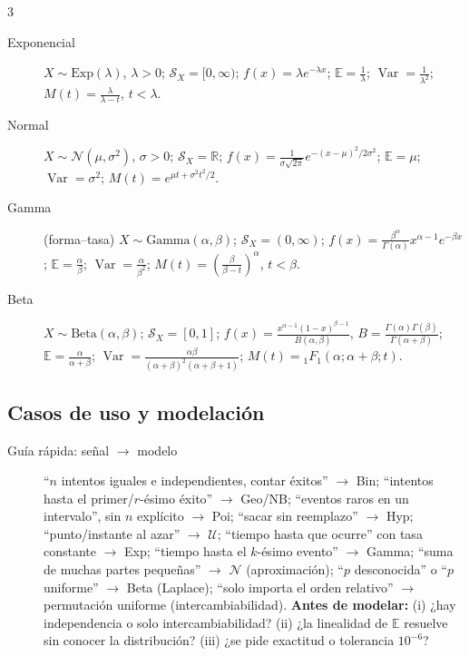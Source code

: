 \documentclass[8pt, spanish, mexico, letterpaper]{extarticle}
\newcommand{\E}{\mathbb{E}}
\newcommand{\Var}{\operatorname{Var}}
\newcommand{\<}{<}
\begin{document}
\begin{multicols*}{3}
\begin{description}
\item[Exponencial] $X\!\sim\!\mathrm{Exp}(\lambda)$, $\lambda\!>\!0$; $\mathcal S_X\!=\![0,\infty)$; $f(x)\!=\!\lambda e^{-\lambda x}$; $\E\!=\!\frac1\lambda$; $\Var\!=\!\frac1{\lambda^2}$; $M(t)\!=\!\frac\lambda{\lambda-t}$, $t\!<\!\lambda$.
\item[Normal] $X\!\sim\!\mathcal N(\mu,\sigma^2)$, $\sigma\!>\!0$; $\mathcal S_X\!=\!\mathbb R$; $f(x)\!=\!\frac1{\sigma\sqrt{2\pi}}e^{-(x-\mu)^2/2\sigma^2}$; $\E\!=\!\mu$; $\Var\!=\!\sigma^2$; $M(t)\!=\!e^{\mu t+\sigma^2t^2/2}$.
\item[Gamma] (forma--tasa) $X\!\sim\!\mathrm{Gamma}(\alpha,\beta)$; $\mathcal S_X\!=\!(0,\infty)$; $f(x)\!=\!\frac{\beta^\alpha}{\Gamma(\alpha)}x^{\alpha-1}e^{-\beta x}$; $\E\!=\!\frac\alpha\beta$; $\Var\!=\!\frac\alpha{\beta^2}$; $M(t)\!=\!(\frac\beta{\beta-t})^\alpha$, $t\!<\!\beta$.
\item[Beta] $X\!\sim\!\mathrm{Beta}(\alpha,\beta)$; $\mathcal S_X\!=\![0,1]$; $f(x)\!=\!\frac{x^{\alpha-1}(1-x)^{\beta-1}}{B(\alpha,\beta)}$, $B\!=\!\frac{\Gamma(\alpha)\Gamma(\beta)}{\Gamma(\alpha+\beta)}$; $\E\!=\!\frac\alpha{\alpha+\beta}$; $\Var\!=\!\frac{\alpha\beta}{(\alpha+\beta)^2(\alpha+\beta+1)}$; $M(t)\!=\!{}_1F_1(\alpha;\alpha\!+\!\beta;t)$.
\end{description}




\subsection{Casos de uso y modelación}
\begin{description}
\item[Guía rápida: señal $\to$ modelo] ``$n$ intentos iguales e independientes, contar éxitos'' $\to$ Bin; ``intentos hasta el primer/$r$-ésimo éxito'' $\to$ Geo/NB; ``eventos raros en un intervalo'', sin $n$ explícito $\to$ Poi; ``sacar sin reemplazo'' $\to$ Hyp; ``punto/instante al azar'' $\to$ $\mathcal U$; ``tiempo hasta que ocurre'' con tasa constante $\to$ Exp; ``tiempo hasta el $k$-ésimo evento'' $\to$ Gamma; ``suma de muchas partes pequeñas'' $\to$ $\mathcal N$ (aproximación); ``$p$ desconocida'' o ``$p$ uniforme'' $\to$ Beta (Laplace); ``solo importa el orden relativo'' $\to$ permutación uniforme (intercambiabilidad). \textbf{Antes de modelar:} (i) ¿hay independencia o solo intercambiabilidad? (ii) ¿la linealidad de $\E$ resuelve sin conocer la distribución? (iii) ¿se pide exactitud o tolerancia $10^{-6}$?


\end{description}
\end{multicols*}
\end{document}
